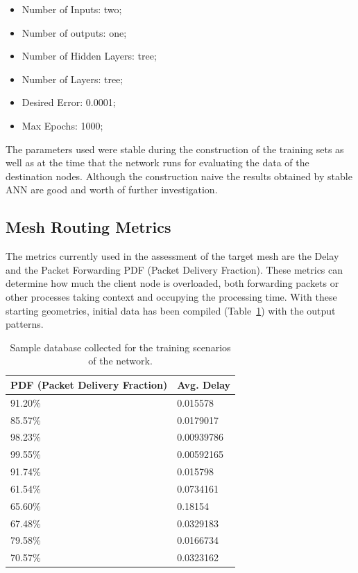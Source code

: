 \documentclass[10pt, conference, compsocconf]{IEEEtran}
\begin{document}
\begin{itemize}\label{lst:1}
	\item Number of Inputs: two;
	\item Number of outputs: one;
	\item Number of Hidden Layers: tree;
	\item Number of Layers: tree;
	\item Desired Error: 0.0001;
	\item Max Epochs: 1000;
\end{itemize}

The parameters used were stable during the construction of the training sets as well as at the time that the network runs for evaluating the data of the destination nodes. Although the construction naive the results obtained by stable ANN are good and worth of further investigation.


\subsection{Mesh Routing Metrics}

The metrics currently used in the assessment of the target mesh are the Delay and the Packet Forwarding PDF (Packet Delivery Fraction). These metrics can determine how much the client node is overloaded, both forwarding packets or other processes taking context and occupying the processing time. With these starting geometries, initial data has been compiled (Table~\ref{tab:base}) with the output patterns.

\begin{table}[h]
	\begin{center}
	\begin{tabular}{|l|l|}
		\hline
		PDF (Packet Delivery Fraction) 	& Avg. Delay \\ \hline\hline
		91.20\%	& 0.015578 \\ \hline
		85.57\%	& 0.0179017 \\ \hline
		98.23\%	& 0.00939786 \\ \hline
		99.55\%	& 0.00592165 \\ \hline
		91.74\%	& 0.015798 \\ \hline
		61.54\%	& 0.0734161 \\ \hline
		65.60\%	& 0.18154 \\ \hline
		67.48\%	& 0.0329183 \\ \hline
		79.58\%	& 0.0166734 \\ \hline
		70.57\%	& 0.0323162 \\ \hline
	\end{tabular}
	\caption{Sample database collected for the training scenarios of the network.}
	\label{tab:base}
	\end{center}
\end{table}
\end{document}
